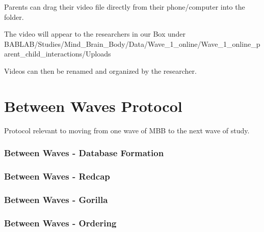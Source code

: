 \documentclass[]{book}
\begin{document}
Parents can drag their video file directly from their phone/computer into the folder.

The video will appear to the researchers in our Box under BABLAB/Studies/Mind\_Brain\_Body/Data/Wave\_1\_online/Wave\_1\_online\_parent\_child\_interactions/Uploads

Videos can then be renamed and organized by the researcher.

\hypertarget{between-waves-protocol}{%
\chapter{Between Waves Protocol}\label{between-waves-protocol}}

Protocol relevant to moving from one wave of MBB to the next wave of study.

\hypertarget{between-waves---database-formation}{%
\subsection{Between Waves - Database Formation}\label{between-waves---database-formation}}

\hypertarget{between-waves---redcap}{%
\subsection{Between Waves - Redcap}\label{between-waves---redcap}}

\hypertarget{between-waves---gorilla}{%
\subsection{Between Waves - Gorilla}\label{between-waves---gorilla}}

\hypertarget{between-waves---ordering}{%
\subsection{Between Waves - Ordering}\label{between-waves---ordering}}


\end{document}
